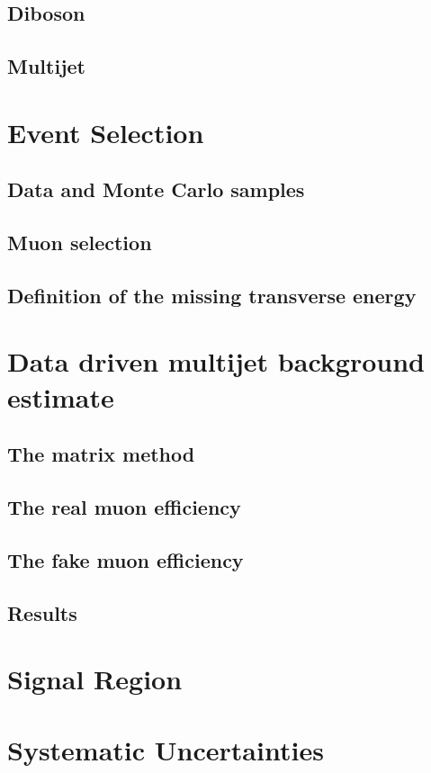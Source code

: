 \subsection{Diboson}
\subsection{Multijet}

\section{Event Selection}
\label{sec:wprimeEventSelection}
\subsection{Data and Monte Carlo samples}
\subsection{Muon selection}
\subsection{Definition of the missing transverse energy}

\section{Data driven multijet background estimate}
\label{sec:wprimeMultijetBackground}
\subsection{The matrix method}
\subsection{The real muon efficiency}
\subsection{The fake muon efficiency}
\subsection{Results}

\section{Signal Region}
\label{sec:wprimeSignalRegion}

\section{Systematic Uncertainties}
\label{sec:wprimeSystematics}
